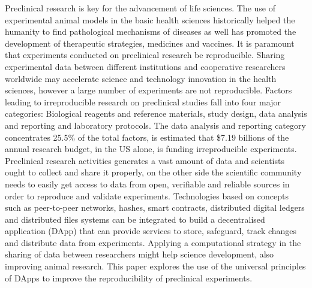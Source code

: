 
Preclinical research is key for the advancement of life sciences. The use of experimental animal models in the basic health sciences historically helped the humanity to find pathological mechanisms of diseases as well has promoted the development of therapeutic strategies, medicines and vaccines. It is paramount that experiments conducted on preclinical research be reproducible. Sharing experimental data between different institutions and cooperative researchers worldwide may accelerate science and technology innovation in the health sciences, however a large number of experiments are not reproducible. Factors leading to irreproducible research on preclinical studies fall into four major categories: Biological reagents and reference materials,  study design, data analysis and reporting and laboratory protocols. The data analysis and reporting category concentrates 25.5\% of the total factors, is estimated that \$7.19 billions of the annual research budget, in the US alone, is funding irreproducible experiments. Preclinical research activities generates a vast amount of data and scientists ought to collect and share it properly, on the other side the scientific community needs to easily get access to data from open, verifiable and reliable sources in order to reproduce and validate experiments. 
Technologies based on concepts such as peer-to-peer networks, hashes, smart contracts, distributed digital ledgers and distributed files systems can be integrated to build a decentralised application (DApp) that can provide services to store, safeguard, track changes and distribute data from experiments.  
Applying a computational strategy in the sharing of data between researchers might help science development, also improving animal research. This paper explores the use of the universal principles of DApps to improve the reproducibility of preclinical experiments.


